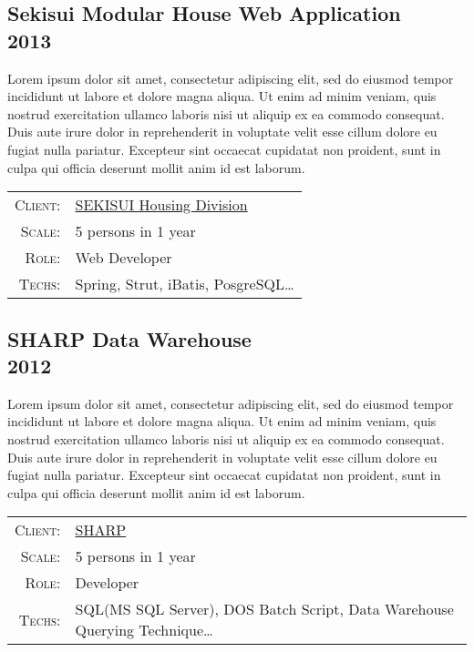 \documentclass[a4paper,10pt]{article}
\begin{document}
\subsection*{Sekisui Modular House Web Application\\\small 2013}

Lorem ipsum dolor sit amet, consectetur adipiscing elit, sed do eiusmod tempor incididunt ut labore et dolore magna aliqua. Ut enim ad minim veniam, quis nostrud exercitation ullamco laboris nisi ut aliquip ex ea commodo consequat. Duis aute irure dolor in reprehenderit in voluptate velit esse cillum dolore eu fugiat nulla pariatur. Excepteur sint occaecat cupidatat non proident, sunt in culpa qui officia deserunt mollit anim id est laborum.

\begin{tabular}{rl}
    \textsc{Client:} & \href{http://www.sekisuichemical.com/about/division/housing/}{SEKISUI Housing Division}\\
    \textsc{Scale:} & 5 persons in 1 year\\
    \textsc{Role:} & Web Developer\\
    \textsc{Techs:} & Spring, Strut, iBatis, PosgreSQL\ldots\\
\end{tabular}

\subsection*{SHARP Data Warehouse\\\small 2012}

Lorem ipsum dolor sit amet, consectetur adipiscing elit, sed do eiusmod tempor incididunt ut labore et dolore magna aliqua. Ut enim ad minim veniam, quis nostrud exercitation ullamco laboris nisi ut aliquip ex ea commodo consequat. Duis aute irure dolor in reprehenderit in voluptate velit esse cillum dolore eu fugiat nulla pariatur. Excepteur sint occaecat cupidatat non proident, sunt in culpa qui officia deserunt mollit anim id est laborum.

\begin{tabular}{rl}
    \textsc{Client:} & \href{http://www.sharp-world.com/}{SHARP}\\
    \textsc{Scale:} & 5 persons in 1 year\\
    \textsc{Role:} & Developer\\
    \textsc{Techs:} & SQL(MS SQL Server), DOS Batch Script, Data Warehouse Querying Technique\ldots\\
\end{tabular}
\end{document}
